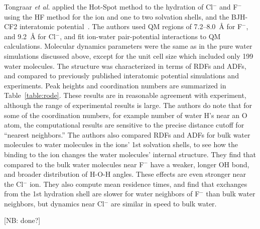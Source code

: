 \documentclass[11pt]{revtex4}
\begin{document}
Tongraar {\it et al.} applied the Hot-Spot method to the
hydration of Cl$^-$ and F$^-$ using the HF method for the
ion and one to two solvation shells, and the BJH-CF2 interatomic
potential~\cite{tongraar_phys_chem_chem_phys_2003a,tongraar_chem_phys_lett_2005a}.
The authors used QM regions of 7.2--8.0~{\AA} for F$^-$, and 9.2~{\AA} for
Cl$^-$, and fit ion-water pair-potential interactions to QM calculations.
Molecular dynamics parameters were the same as in the pure water
simulations discussed above, except for the unit cell size which included
only 199 water molecules.  The structure was characterized in terms of
RDFs and ADFs, and compared to previously published interatomic potential
simulations and experiments.  Peak heights and coordination numbers are
summarized in Table~\ref{table:rode}.  These results are in reasonable
agreement with experiment, although the range of experimental results
is large.  The authors do note that for some of the coordination numbers,
for example number of water H's near an O atom, the computational results
are sensitive to the precise distance cutoff for ``nearest neighbors.''
The authors also compared RDFs and ADFs for bulk water molecules to water
molecules in the ions' 1st solvation shells, to see how the binding to
the ion changes the water molecules' internal structure.   They find that
compared to the bulk water molecules near F$^-$ have a weaker, longer OH
bond, and broader distribution of H-O-H angles.  These effects are even
stronger near the Cl$^-$ ion.  They also compute mean residence times,
and find that exchanges from the 1st hydration shell are slower for water
neighbors of F$^-$ than bulk water neighbors, but dynamics near Cl$^-$
are similar in speed to bulk water.

[NB: done?]

 
\end{document}
